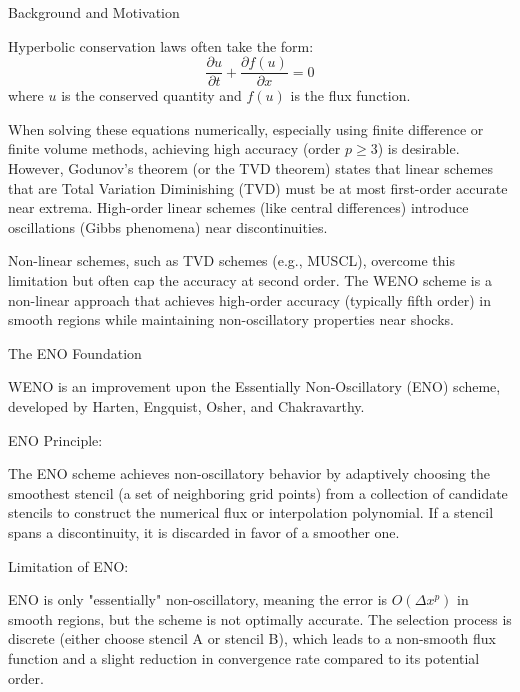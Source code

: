 \documentclass[12pt,a4paper]{article}
\begin{document}
\begin{description}

\item Background and Motivation

Hyperbolic conservation laws often take the form:
$$\frac{\partial u}{\partial t} + \frac{\partial f(u)}{\partial x} = 0$$
where $u$ is the conserved quantity and $f(u)$ is the flux function.

When solving these equations numerically, especially using finite difference or finite volume methods, achieving high accuracy (order $p \ge 3$) is desirable. However, Godunov's theorem (or the TVD theorem) states that linear schemes that are Total Variation Diminishing (TVD) must be at most first-order accurate near extrema. High-order linear schemes (like central differences) introduce oscillations (Gibbs phenomena)\cite{gibbs} near discontinuities.

Non-linear schemes, such as TVD schemes (e.g., MUSCL), overcome this limitation but often cap the accuracy at second order. The WENO scheme is a non-linear approach that achieves high-order accuracy (typically fifth order) in smooth regions while maintaining non-oscillatory properties near shocks.

\item  The ENO Foundation

WENO is an improvement upon the Essentially Non-Oscillatory (ENO)\cite{eno} scheme, developed by Harten, Engquist, Osher, and Chakravarthy.

\begin{description}

\item ENO Principle: 

The ENO scheme achieves non-oscillatory behavior by adaptively choosing the smoothest stencil (a set of neighboring grid points) from a collection of candidate stencils to construct the numerical flux or interpolation polynomial. If a stencil spans a discontinuity, it is discarded in favor of a smoother one.

\item Limitation of ENO:

 ENO is only "essentially" non-oscillatory, meaning the error is $O(\Delta x^p)$ in smooth regions, but the scheme is not optimally accurate. The selection process is discrete (either choose stencil A or stencil B), which leads to a non-smooth flux function and a slight reduction in convergence rate compared to its potential order.


\end{description}
\end{description}
\end{document}
